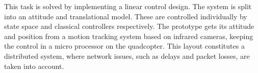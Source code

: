 
This task is solved by implementing a linear control design. The system is split into an attitude and translational model. These are controlled individually by state space and classical controllers respectively. The prototype gets its attitude and position from a motion tracking system based on infrared cameras, keeping the control in a micro processor on the quadcopter. This layout constitutes a distributed system, where network issues, such as delays and packet losses, are taken into account.